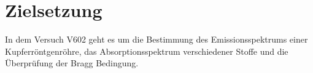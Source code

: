 \section{Zielsetzung} 

\begin{flushleft}
    In dem Versuch V602 geht es um die Bestimmung des Emissionsspektrums einer Kupferröntgenröhre, das Absorptionsspektrum verschiedener Stoffe und die Überprüfung der Bragg Bedingung. 
\end{flushleft}


